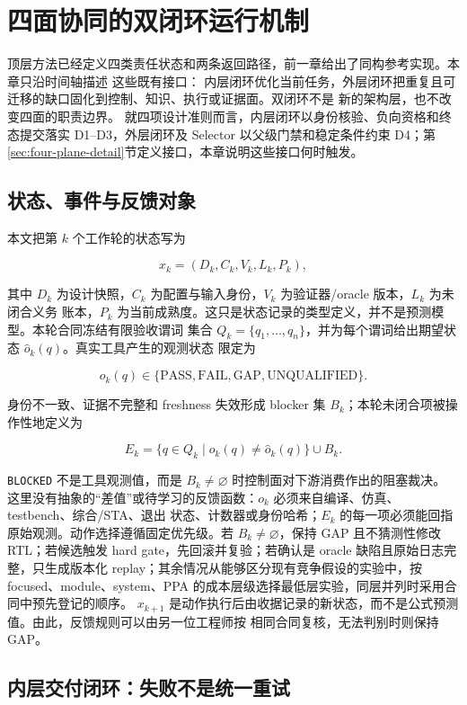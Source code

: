 \documentclass[UTF8,a4paper,zihao=-4,oneside]{ctexart}
\newcommand{\statusword}[1]{\texttt{#1}}
\begin{document}
\section{四面协同的双闭环运行机制}

顶层方法已经定义四类责任状态和两条返回路径，前一章给出了同构参考实现。本章只沿时间轴描述
这些既有接口：
内层闭环优化当前任务，外层闭环把重复且可迁移的缺口固化到控制、知识、执行或证据面。双闭环不是
新的架构层，也不改变四面的职责边界。
就四项设计准则而言，内层闭环以身份核验、负向资格和终态提交落实 D1--D3，外层闭环及 Selector
以父级门禁和稳定条件约束 D4；第\ref{sec:four-plane-detail}节定义接口，本章说明这些接口何时触发。

\subsection{状态、事件与反馈对象}

本文把第 $k$ 个工作轮的状态写为

\[
x_k=(D_k,C_k,V_k,L_k,P_k),
\]

其中 $D_k$ 为设计快照，$C_k$ 为配置与输入身份，$V_k$ 为验证器/oracle 版本，$L_k$ 为未闭合义务
账本，$P_k$ 为当前成熟度。这只是状态记录的类型定义，并不是预测模型。本轮合同冻结有限验收谓词
集合 $Q_k=\{q_1,\ldots,q_n\}$，并为每个谓词给出期望状态 $\hat{o}_k(q)$。真实工具产生的观测状态
限定为

\[
o_k(q)\in\{\mathrm{PASS},\mathrm{FAIL},\mathrm{GAP},\mathrm{UNQUALIFIED}\}.
\]

身份不一致、证据不完整和 freshness 失效形成 blocker 集 $B_k$；本轮未闭合项被操作性地定义为

\[
E_k=\{q\in Q_k\mid o_k(q)\neq \hat{o}_k(q)\}\cup B_k.
\]

\statusword{BLOCKED} 不是工具观测值，而是 $B_k\neq\varnothing$ 时控制面对下游消费作出的阻塞裁决。
这里没有抽象的“差值”或待学习的反馈函数：$o_k$ 必须来自编译、仿真、testbench、综合/STA、退出
状态、计数器或身份哈希；$E_k$ 的每一项必须能回指原始观测。动作选择遵循固定优先级。若
$B_k\neq\varnothing$，保持 GAP 且不猜测性修改 RTL；若候选触发 hard gate，先回滚并复验；若确认是
oracle 缺陷且原始日志完整，只生成版本化 replay；其余情况从能够区分现有竞争假设的实验中，按
focused、module、system、PPA 的成本层级选择最低层实验，同层并列时采用合同中预先登记的顺序。
$x_{k+1}$ 是动作执行后由收据记录的新状态，而不是公式预测值。由此，反馈规则可以由另一位工程师按
相同合同复核，无法判别时则保持 GAP。

\subsection{内层交付闭环：失败不是统一重试}
\end{document}
